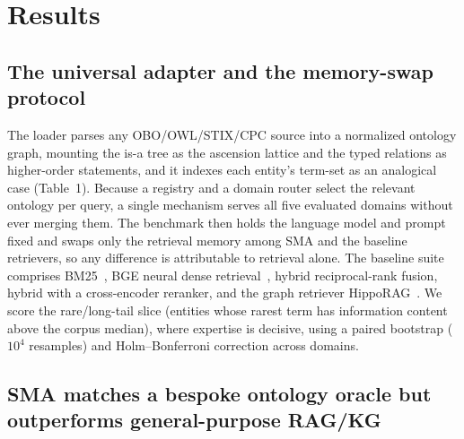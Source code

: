 \documentclass[pdflatex,sn-nature]{sn-jnl}
\begin{document}
\section{Results}\label{sec:results}

\subsection{The universal adapter and the memory-swap protocol}
 The loader parses
any OBO/OWL/STIX/CPC source into a normalized ontology graph, mounting the is-a
tree as the ascension lattice and the typed relations as higher-order statements,
and it indexes each entity's term-set as an analogical case (Table~1). Because a
registry and a domain router select the relevant ontology per query, a single
mechanism serves all five evaluated domains without ever merging them. The
benchmark then holds the language model and prompt fixed and swaps only the
retrieval memory among SMA and the baseline retrievers, so any difference is
attributable to retrieval alone. The baseline suite comprises
BM25~\cite{robertson2009bm25}, BGE neural dense retrieval~\cite{karpukhin2020dpr},
hybrid reciprocal-rank fusion, hybrid with a cross-encoder reranker, and the graph
retriever HippoRAG~\cite{gutierrez2024hipporag}. We score the rare/long-tail slice
(entities whose rarest term has information content above the corpus median),
where expertise is decisive, using a paired bootstrap ($10^4$ resamples) and
Holm--Bonferroni correction across domains.

\subsection{SMA matches a bespoke ontology oracle but outperforms general-purpose RAG/KG}
\end{document}
